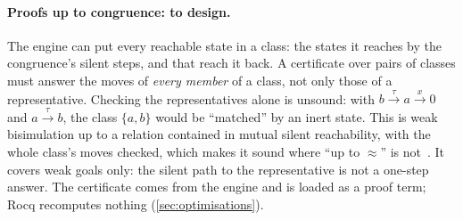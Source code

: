 \paragraph{Proofs up to congruence: to design.} The engine can put every
reachable state in a class: the states it reaches by the congruence's
silent steps, and that reach it back. A certificate over pairs of classes
must answer the moves of \emph{every member} of a class, not only those of
a representative. Checking the representatives alone is unsound: with $b
\xrightarrow{\tau} a \xrightarrow{x} 0$ and $a \xrightarrow{\tau} b$, the
class $\{a, b\}$ would be ``matched'' by an inert state. This is weak
bisimulation up to a relation contained in mutual silent reachability,
with the whole class's moves checked, which makes it sound where ``up to
$\approx$'' is not~\cite{pous-sangiorgi11}. It covers weak goals only:
the silent path to the representative is not a one-step answer. The
certificate comes from the engine and is loaded as a proof term; Rocq
recomputes nothing (\cref{sec:optimisations}).
